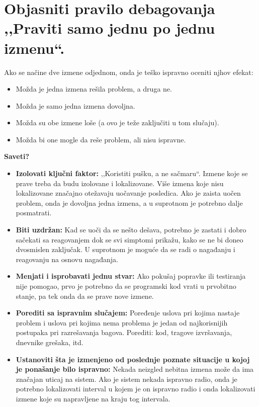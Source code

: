 \documentclass[a4paper]{article}
\begin{document}
\section{Objasniti pravilo debagovanja ,,Praviti samo jednu po jednu izmenu``.}
  Ako se načine dve izmene odjednom, onda je teško ispravno oceniti njhov efekat:
  \begin{itemize}
    \item Možda je jedna izmena rešila problem, a druga ne.
    \item Možda je samo jedna izmena dovoljna.
    \item Možda su obe izmene loše (a ovo je teže zaključiti u tom slučaju).
    \item Možda bi one mogle da reše problem, ali nisu ispravne.
  \end{itemize}
  \textbf{Saveti?}
  \begin{itemize}
    \item \textbf{Izolovati ključni faktor:} ,,Koristiti pušku, a ne sačmaru``. Izmene koje se prave
          treba da budu izolovane i lokalizovane. Više izmena koje nisu lokalizovane značajno
          otežavaju uočavanje posledica. Ako je zaista uočen problem, onda je dovoljna jedna izmena,
          a u suprotnom je potrebno dalje posmatrati.
    \item \textbf{Biti uzdržan:} Kad se uoči da se nešto dešava, potrebno je zastati i
          dobro sačekati sa reagovanjem dok se svi simptomi prikažu, kako se ne bi doneo
          dvosmislen zaključak. U suprotnom je moguće da se radi o nagađanju i reagovanju
          na osnovu nagađanja.
    \item \textbf{Menjati i isprobavati jednu stvar:} Ako pokušaj popravke ili testiranja nije pomogao,
          prvo je potrebno da se programski kod vrati u prvobitno stanje, pa tek onda da se prave
          nove izmene.
    \item \textbf{Porediti sa ispravnim slučajem:} Poređenje uslova pri kojima nastaje problem
          i uslova pri kojima nema problema je jedan od najkorisnijih postupaka pri razrešavanja
          bagova. Porediti: kod, tragove izvršavanja, dnevnike grešaka, itd.
    \item \textbf{Ustanoviti šta je izmenjeno od poslednje poznate situacije u kojoj je ponašanje
          bilo ispravno:} Nekada neizgled nebitna izmena može da ima značajan uticaj na sistem. Ako
          je sistem nekada ispravno radio, onda je potrebno lokalizovati interval u kojem
          je on ispravno radio i onda lokalizovati izmene koje su napravljene na kraju tog intervala.
  \end{itemize}
\end{document}
